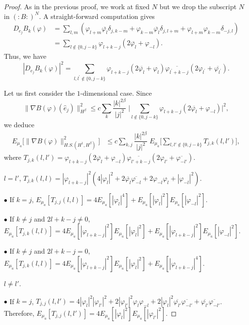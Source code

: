 \documentclass[11pt,leqno]{amsart}
\begin{document}
\begin{proof}
As in the previous proof, we work at fixed $N$ but we drop the subscript $N$ in $(:B:)^N$.
A straight-forward computation gives  
\begin{align*}
D_{e_j} B_k (\varphi)&
= \sum_{l,m} (\varphi_{l+m} \overline{\varphi_l} \delta_{j,k-m}+ \varphi_{k-m} \overline{\varphi_l} \delta_{j,l+m}+ \varphi_{l+m} \varphi_{k-m} \delta_{-j,l}) \\
&=  \sum_{l\notin \{ 0, j-k\}} \varphi_{l+k-j} ( 2\overline{\varphi_l} + \varphi_{-l}).  
\end{align*}
Thus, we have
$$|D_{e_j} B_k (\varphi)|^2 = \sum_{l,l^\prime \notin \{ 0, j-k\}} \varphi_{l+k-j} (2 \overline{\varphi_l}+ \varphi_l )  \overline{\varphi_{l^\prime+k-j}} (2\varphi_{l^\prime}+ \overline{\varphi_{l^\prime}}) .$$

Let us first consider  the $1$-dimensional case. Since
$$\|\nabla B(\varphi) (\hat{e}_j)\|_{H^\beta}^2 \leq c \sum_{k} \dfrac{|k|^{2\beta}}{|j|^{2}}\;  \Big| \sum_{l\notin \{ 0, j-k\}}
 \varphi_{l+k-j}  (2 \overline{\varphi_l} + \varphi_{-l})  \Big|^2, $$
 we deduce
\begin{align*}
E_{\mu_a} \big[ \|\nabla B (\varphi)\|^2_{H.S. (H^1 ,H^\beta) }\big] &\leq  c \sum_{k,j} \dfrac{|k|^{2\beta}}{|j|^{2}} \;  E_{\mu_a} \Big[ \sum_{l,l'\notin \{0,  j-k\}}   T_{j,k}(l,l')\Big],
\end{align*}
 where $T_{j,k}(l,l')=\varphi_{l+k-j}  (2\overline{\varphi_l} +\varphi_{-l}) \overline{\varphi_{l'+k-j}} (2 \varphi_{l'} + \overline{\varphi_{-l'}}) $.
\bigskip

 $l=l'$, $T_{j,k}(l,l) = |\varphi_{l+k-j}|^2 (4 |\varphi_l|^2 + 2 \overline{\varphi_{l}} \overline{\varphi_{-l}} + 2 \varphi_{-l} \varphi_l  + |\varphi_{-l}|^2)$. 

\;  $\bullet$ If $k=j$, $E_{\mu_a}[T_{j,j}(l,l) ]=4  E_{\mu_a}[  |\varphi_l|^4 ] + E_{\mu_a} [|\varphi_l|^2 ] E_{\mu_a} [ |\varphi_{-l}|^2]$. 

\;  $\bullet$ If $k\neq j$ and $2l+k-j\neq 0$, $E_{\mu_a}[T_{j,k}(l,l) ] = 4 E_{\mu_a}[|\varphi_{l+k-j}|^2] E_{\mu_a}[ |\varphi_l|^2 ] + E_{\mu_a}[|\varphi_{l+k-j}|^2]  E_{\mu_a} [|\varphi_{-l}|^2] $. 

\;  $\bullet$ If  $k\neq j$ and $2l+k-j=  0$, $E_{\mu_a}[T_{j,k}(l,l) ]=  4 E_{\mu_a}[|\varphi_{l+k-j}|^2] E_{\mu_a}[ |\varphi_l|^2 ]  + E_{\mu_a}[|\varphi_{l+k-j}|^4]$.  
\bigskip

 $l\neq l'$. 

\indent $\bullet$ If $k=j$,  $T_{j,j}(l,l') = 4  |\varphi_l|^2   |\varphi_{l'}|^2 + 2 |\varphi_{l'}|^2 \varphi_l  \varphi_{-l}  + 2 |\varphi_l|^2 \overline{\varphi_{l'}} \overline {\varphi_{-l'}}
+ \overline{ \varphi_{l'}} \overline{ \varphi_{-l'}}$.  Therefore,
$E_{\mu_a}[ T_{j,j}(l,l') ] = 4  E_{\mu_a} [ |\varphi_l|^2]  E_{\mu_a}[  |\varphi_{l'}|^2]$.  


\end{proof}
\end{document}
